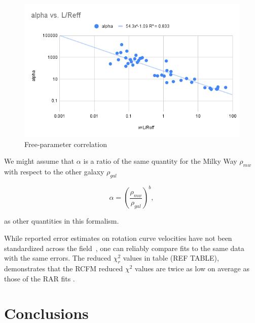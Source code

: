 \documentclass[reprint,%
 amsmath,amssymb,
 aps,
]{revtex4-1}
\begin{document}
 \begin{figure}[h]
\includegraphics[width=\linewidth]{alphavL_Reff.png} 
\caption{  Free-parameter correlation   }
\label{alpha2}
\end{figure}  
 


We might assume that $\alpha$ is a ratio of the same quantity for  the Milky Way $\rho_{mw}$ with respect to the other   galaxy $\rho_{gal}$  

\begin{equation}
\alpha=\left(\frac{\rho_{mw}}{\rho_{gal}}\right)^{b}  ,
\label{correl}
\end{equation}

as other quantities in this formalism.
 

While reported error    estimates on rotation curve velocities  have not been standardized across the field~\citep{Blok,Gent},     one can reliably   compare fits to the same data with the same  errors. The     reduced $\chi^2_r$ values in table (REF TABLE), demonstrates that the RCFM reduced $\chi^2$ values are twice as low on average as those of the RAR fits  \cite{McGaugh2016RAR}.


 
 \section{  Conclusions \label{sec:conclu}  }
 
\end{document}
